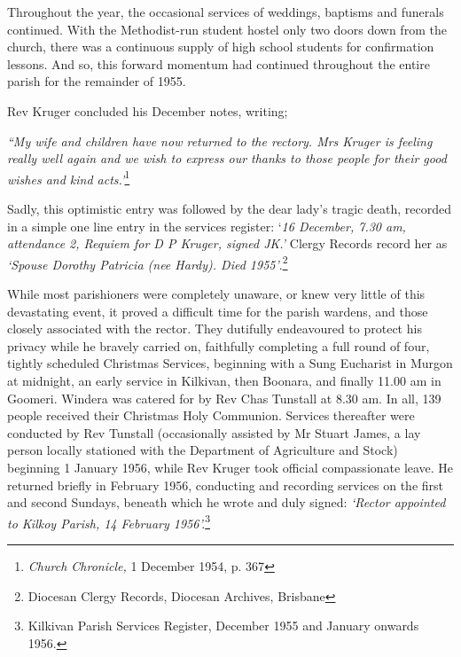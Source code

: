 Throughout the year, the occasional services of weddings, baptisms and funerals continued. With the Methodist-run student hostel only two doors down from the church, there was a continuous supply of high school students for confirmation lessons. And so, this forward momentum had continued throughout the entire parish for the remainder of 1955.



Rev Kruger concluded his December notes, writing;



\emph{``My wife and children have now returned to the rectory. Mrs Kruger is feeling really well again and we wish to express our thanks to those people for their good wishes and kind acts.'}\footnote{\emph{Church Chronicle,} 1 December 1954, p. 367}


\smallskip


Sadly, this optimistic entry was followed by the dear lady's tragic death, recorded in a simple one line entry in the services register: `\emph{16 December, 7.30 am, attendance 2, Requiem for D P Kruger, signed JK.'} Clergy Records record her as \emph{`Spouse Dorothy Patricia (nee Hardy). Died 1955'}.\footnote{Diocesan Clergy Records, Diocesan Archives, Brisbane}


\smallskip


While most parishioners were completely unaware, or knew very little of this devastating event, it proved a difficult time for the parish wardens, and those closely associated with the rector. They dutifully endeavoured to protect his privacy while he bravely carried on, faithfully completing a full round of four, tightly scheduled Christmas Services, beginning with a Sung Eucharist in Murgon at midnight, an early service in Kilkivan, then Boonara, and finally 11.00 am in Goomeri. Windera was catered for by Rev Chas Tunstall at 8.30 am. In all, 139 people received their Christmas Holy Communion. Services thereafter were conducted by Rev Tunstall (occasionally assisted by Mr Stuart James, a lay person locally stationed with the Department of Agriculture and Stock) beginning 1 January 1956, while Rev Kruger took official compassionate leave. He returned briefly in February 1956, conducting and recording services on the first and second Sundays, beneath which he wrote and duly signed: \emph{`Rector appointed to Kilkoy Parish, 14 February 1956'.}\footnote{Kilkivan Parish Services Register, December 1955 and January onwards 1956.}


